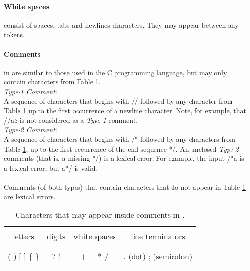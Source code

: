\documentclass{article}
\begin{document}
\paragraph{White spaces} consist of spaces, tabs and newlines characters.
They may appear between any tokens.
\paragraph{Comments} in \plname are similar to those used in the C programming language,
but may only contain characters from Table \ref{Table_Characters_That_May_Appear_inside_Comments}.
\\
\textit{Type-1 Comment}: \\
A sequence of characters that begins with // followed by any character from Table \ref{Table_Characters_That_May_Appear_inside_Comments}
up to the first occurrence of a newline character.
Note, for example, that //a\$ is not considered as a \textit{Type-1} comment.
\\
\textit{Type-2 Comment}: \\
A sequence of characters that begins with /* followed by any characters from Table \ref{Table_Characters_That_May_Appear_inside_Comments},
up to the first occurrence of the end sequence */.
An unclosed \textit{Type-2} comments (that is, a missing */) is a lexical error.
For example, the input /*a is a lexical error, but a*/ is valid.
\\
\\
Comments (of both types) that contain characters that do not appear in Table \ref{Table_Characters_That_May_Appear_inside_Comments} are lexical errors.

\begin{table}[h]
\centering
\begin{tabular}{ | c | c | c | c | }
\hline
        &        &              &                  \\
letters & digits & white spaces & line terminators \\
        &        &              &                  \\
\hline
                  &     &                 &                       \\
( ) [ ] $\{$ $\}$ & ? ! & $+$ $-$ $*$ $/$ & . (dot) ; (semicolon) \\
                  &     &                 &                       \\
\hline
\end{tabular}
\caption{
Characters that may appear inside comments in \plname.
\label{Table_Characters_That_May_Appear_inside_Comments}}
\end{table}
\end{document}
